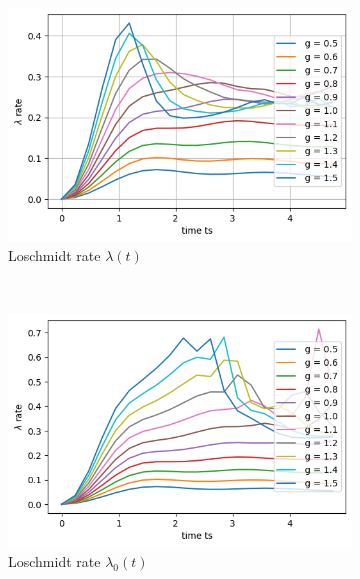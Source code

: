 \begin{figure}[h]
    \centering
    \caption{Simulated Loschmidt rates for fixed sytsem size of L=12 and varying strength of the transverse field g=2.}
    \label{fig:LoschmidtManyGs}
    \addtocounter{figure}{-1}
    \begin{subfigure}[t]{0.48\textwidth}
        \includegraphics[width=\textwidth]{tex/figures/LochschmidtManyGs.png}
        \caption{Loschmidt rate $\lambda(t)$}
    \end{subfigure}\\
    \begin{subfigure}[t]{0.48\textwidth}
        \includegraphics[width=\textwidth]{tex/figures/Lochschmidt0ManyGs.png}
         \caption{Loschmidt rate $\lambda_0(t)$}
    \end{subfigure}
    \begin{subfigure}[t]{0.48\textwidth}

\end{subfigure}
\end{figure}

